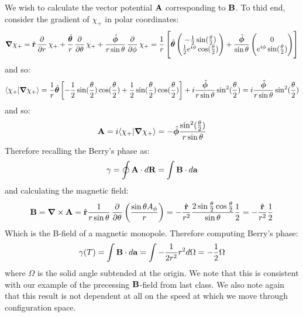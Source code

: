 We wish to calculate the vector potential $\mathbf{A}$ corresponding to $\mathbf{B}$. To thid end, consider the gradient of $\chi_+$ in polar coordinates:
\begin{equation}
    \nabla \chi_+ = \rhat \dpd{}{r}\chi_+ + \frac{\thetahat}{r}\dpd{}{\theta}\chi_+ + \frac{\phihat}{r\sin\theta}\dpd{}{\phi}\chi_+ = \frac{1}{r}\left[\thetahat\m{-\frac{1}{2}\sin(\frac{\theta}{2}) \\ \frac{1}{2}e^{i\phi}\cos(\frac{\theta}{2})} + \frac{\phihat}{\sin\theta}\m{0 \\ e^{i\phi}\sin(\frac{\theta}{2})}\right]
\end{equation}
and so:
\begin{equation}
    \braket{\chi_+}{\nabla \chi_+} = \frac{1}{r}\thetahat\left[-\frac{1}{2}\sin(\frac{\theta}{2})\cos(\frac{\theta}{2}) + \frac{1}{2}\sin(\frac{\theta}{2})\cos(\frac{\theta}{2})\right] + i\frac{\phihat}{r\sin\theta}\sin^2(\frac{\theta}{2}) = i\frac{\phihat}{r\sin\theta}\sin^2(\frac{\theta}{2})
\end{equation}
and so:
\begin{equation}
    \v{A} = i\braket{\chi_+}{\nabla \chi_+} = -\phihat\frac{\sin^2(\frac{\theta}{2})}{r\sin\theta}
\end{equation}
Therefore recalling the Berry's phase as:
\begin{equation}
    \gamma = \oint \mathbf{A} \cdot d\mathbf{R} = \int \mathbf{B} \cdot d\mathbf{a}
\end{equation}
and calculating the magnetic field:
\begin{equation}
    \v{B} = \nabla \times \v{A} = \rhat \frac{1}{r\sin\theta}\dpd{}{\theta}\left(\frac{\sin\theta A_\phi}{r}\right) = -\frac{\rhat}{r^2}\frac{2\sin\frac{\theta}{2}\cos\frac{\theta}{2}}{\sin\theta}\frac{1}{2} = -\frac{\rhat}{r^2}\frac{1}{2}
\end{equation}
Which is the B-field of a magnetic monopole. Therefore computing Berry's phase:
\begin{equation}
    \gamma(T) = \int \mathbf{B} \cdot d\mathbf{a} = \int - \frac{1}{2r^2}r^2 d\Omega = -\frac{1}{2}\Omega
\end{equation}
where $\Omega$ is the solid angle subtended at the origin. We note that this is consistent with our example of the precessing $\mathbf{B}$-field from last class. We also note again that this result is not dependent at all on the speed at which we move through configuration space.

